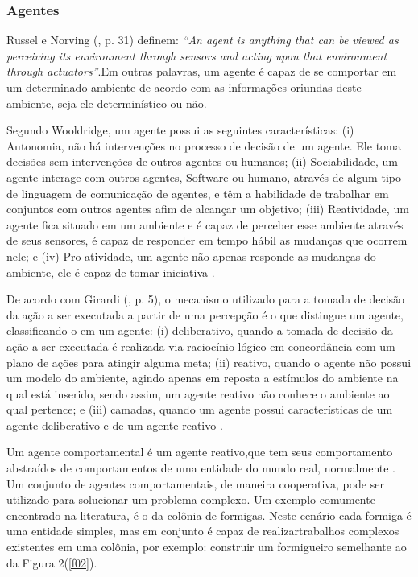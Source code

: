 \subsubsection{Agentes}

Russel e Norving (\citeyear{russel2003}, p. 31) definem: \textit{“An agent is anything that can be viewed as perceiving its environment through sensors and acting upon that environment through actuators”}.Em outras palavras, um agente é capaz de se comportar em um determinado ambiente de acordo com as informações oriundas deste ambiente, seja ele determinístico ou não.

Segundo Wooldridge, um agente possui as seguintes características: (i) Autonomia, não há intervenções no processo de decisão de um agente. Ele toma decisões sem intervenções de outros agentes ou humanos; (ii) Sociabilidade, um agente interage com outros agentes, Software ou humano, através de algum tipo de linguagem de comunicação de agentes, e têm a habilidade de trabalhar em conjuntos com outros agentes afim de alcançar um objetivo; (iii) Reatividade, um agente fica situado em um ambiente e é capaz de perceber esse ambiente através de seus sensores, é capaz de responder em tempo hábil as mudanças que ocorrem nele; e (iv) Pro-atividade, um agente não apenas responde as mudanças do ambiente, ele é capaz de tomar iniciativa \cite[p. 2-3]{wooldrige2002}.

De acordo com Girardi (\citeyear{girardi2004}, p. 5), o mecanismo utilizado para a tomada de decisão da ação a ser executada a partir de uma percepção é o que distingue um agente, classificando-o em um agente: (i) deliberativo, quando a tomada de decisão da ação a ser executada é realizada via raciocínio lógico em concordância com um plano de ações para atingir alguma meta; (ii) reativo, quando o agente não possui um modelo do ambiente, agindo apenas em reposta a estímulos do ambiente na qual está inserido, sendo assim, um agente reativo não conhece o ambiente ao qual pertence; e (iii) camadas, quando um agente possui características de um agente deliberativo e de um agente reativo \cite[p. 5]{girardi2004}. 


Um agente comportamental é um agente reativo,que tem seus comportamento abstraídos de comportamentos de uma entidade do mundo real, normalmente \cite[p. 33]{oliveira2008}. Um conjunto de agentes comportamentais, de maneira cooperativa, pode ser utilizado para solucionar um problema complexo. Um exemplo comumente encontrado na literatura, é o da colônia de formigas. Neste cenário cada formiga é uma entidade simples, mas em conjunto é capaz de realizartrabalhos complexos existentes em uma colônia, por exemplo: construir um formigueiro semelhante ao da Figura 2(\ref{f02}).

